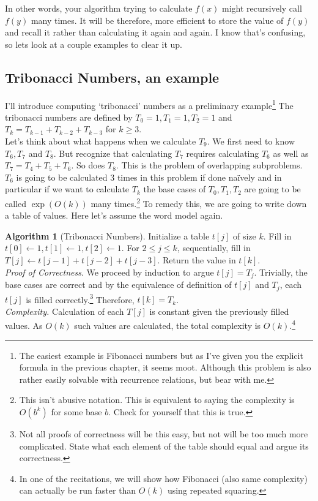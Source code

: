 \documentclass[11pt]{article}
\theoremstyle{plain}
\theoremstyle{definition}
\newtheorem{alg}[thm]{Algorithm}
\numberwithin{equation}{section}
\numberwithin{figure}{section}
\begin{document}
\noindent \noindent In other words, your algorithm trying to calculate $f(x)$ might recursively call $f(y)$ many times. It will be therefore, more efficient to store the value of $f(y)$ and recall it rather than calculating it again and again. I know that's confusing, so lets look at a couple examples to clear it up. 

\subsection{Tribonacci Numbers, an example}
\noindent I'll introduce computing `tribonacci' numbers as a preliminary example\footnote{The easiest example is Fibonacci numbers but as I've given you the explicit formula in the previous chapter, it seems moot. Although this problem is also rather easily solvable with recurrence relations, but bear with me.} The tribonacci numbers are defined by $T_0 = 1, T_1 = 1, T_2 = 1$ and $T_k = T_{k -1} + T_{k-2} + T_{k - 3}$ for $k \geq 3$. \\

\noindent Let's think about what happens when we calculate $T_9$. We first need to know $T_6, T_7$ and $T_8$. But recognize that calculating $T_7$ requires calculating $T_6$ as well as $T_7 = T_4 + T_5 + T_6$. So does $T_8$. This is the problem of overlapping subproblems. $T_6$ is going to be calculated 3 times in this problem if done na\"ively and in particular if we want to calculate $T_k$ the base cases of $T_0, T_1, T_2$ are going to be called $\exp(O(k))$ many times.\footnote{This isn't abusive notation. This is equivalent to saying the complexity is $O(b^k)$ for some base $b$. Check for yourself that this is true.} To remedy this, we are going to write down a table of values. Here let's assume the word model again.

\begin{alg}[Tribonacci Numbers]
Initialize a table $t[j]$ of size $k$. Fill in $t[0] \leftarrow 1, t[1] \leftarrow 1, t[2] \leftarrow 1$. For $2 \leq j \leq k$, sequentially, fill in $T[j] \leftarrow t[j-1] + t[j-2] + t[j-3]$. Return the value in $t[k]$. \\

\noindent \textit{Proof of Correctness}. We proceed by induction to argue $t[j] = T_j$. Trivially, the base cases are correct and by the equivalence of definition of $t[j]$ and $T_j$, each $t[j]$ is filled correctly.\footnote{Not all proofs of correctness will be this easy, but not will be too much more complicated. State what each element of the table should equal and argue its correctness.} Therefore, $t[k] = T_k$. \\

\noindent \textit{Complexity.} Calculation of each $T[j]$ is constant given the previously filled values. As $O(k)$ such values are calculated, the total complexity is $O(k)$.\footnote{In one of the recitations, we will show how Fibonacci (also same complexity) can actually be run faster than $O(k)$ using repeated squaring.}
\end{alg}
\end{document}
